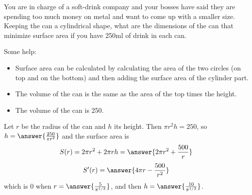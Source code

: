 \documentclass{ximera}
\begin{document}
\begin{exercise}\label{exercise:10-17}
You are in charge of a soft-drink company and your bosses have said they are spending too much money on metal and want to come up with a smaller size. Keeping the can a cylindrical shape, what are the dimensions of the can that minimize surface area if you have 250ml of drink in each can.

Some help:
\begin{itemize}
  \item Surface area can be calculated by calculating the area of the two circles (on top and on the bottom) and then adding the surface area of the cylinder part.
  \item The volume of the can is the same as the area of the top times the height.
  \item The volume of the can is 250.
\end{itemize}

Let $r$ be the radius of the can and $h$ its height. Then $\pi r^{2}h=250$, so $h=\answer{\frac{250}{\pi r^{2}}}$ and the surface area is
\[
S(r)=2\pi r^{2}+2\pi r h=\answer{2\pi r^{2}+\frac{500}{r}}
\]
\[
S^{\prime}(r)=\answer{4\pi r-\frac{500}{r^{2}}}
\]
which is $0$ when $r=\answer{\frac{5}{\pi^{1/3}}}$, and then $h=\answer{\frac{10}{\pi^{1/3}}}$.
\end{exercise}
\end{document}
